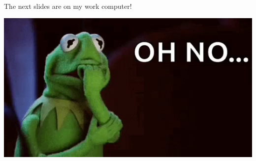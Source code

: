 \documentclass[aspectratio=169]{beamer}
\begin{document}
\begin{frame}{The next slides are on my work computer!}

  \includegraphics[width=\textwidth]{figs/oh_no.png}

\end{frame}
\end{document}
